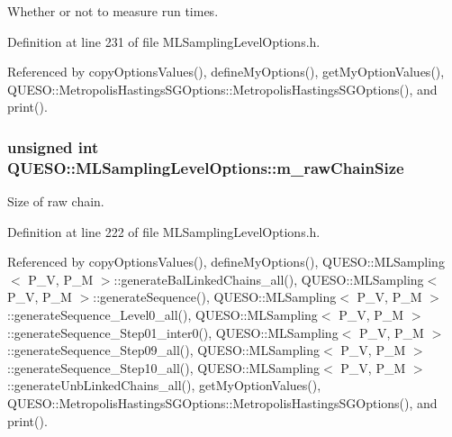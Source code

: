 Whether or not to measure run times. 



Definition at line 231 of file M\-L\-Sampling\-Level\-Options.\-h.



Referenced by copy\-Options\-Values(), define\-My\-Options(), get\-My\-Option\-Values(), Q\-U\-E\-S\-O\-::\-Metropolis\-Hastings\-S\-G\-Options\-::\-Metropolis\-Hastings\-S\-G\-Options(), and print().

\hypertarget{class_q_u_e_s_o_1_1_m_l_sampling_level_options_a8ab85efacd9881ab35b9f01b6e4fc5a3}{
\subsubsection[{m\-\_\-raw\-Chain\-Size}]{\setlength{\rightskip}{0pt plus 5cm}unsigned int Q\-U\-E\-S\-O\-::\-M\-L\-Sampling\-Level\-Options\-::m\-\_\-raw\-Chain\-Size}}\label{class_q_u_e_s_o_1_1_m_l_sampling_level_options_a8ab85efacd9881ab35b9f01b6e4fc5a3}


Size of raw chain. 



Definition at line 222 of file M\-L\-Sampling\-Level\-Options.\-h.



Referenced by copy\-Options\-Values(), define\-My\-Options(), Q\-U\-E\-S\-O\-::\-M\-L\-Sampling$<$ P\-\_\-\-V, P\-\_\-\-M $>$\-::generate\-Bal\-Linked\-Chains\-\_\-all(), Q\-U\-E\-S\-O\-::\-M\-L\-Sampling$<$ P\-\_\-\-V, P\-\_\-\-M $>$\-::generate\-Sequence(), Q\-U\-E\-S\-O\-::\-M\-L\-Sampling$<$ P\-\_\-\-V, P\-\_\-\-M $>$\-::generate\-Sequence\-\_\-\-Level0\-\_\-all(), Q\-U\-E\-S\-O\-::\-M\-L\-Sampling$<$ P\-\_\-\-V, P\-\_\-\-M $>$\-::generate\-Sequence\-\_\-\-Step01\-\_\-inter0(), Q\-U\-E\-S\-O\-::\-M\-L\-Sampling$<$ P\-\_\-\-V, P\-\_\-\-M $>$\-::generate\-Sequence\-\_\-\-Step09\-\_\-all(), Q\-U\-E\-S\-O\-::\-M\-L\-Sampling$<$ P\-\_\-\-V, P\-\_\-\-M $>$\-::generate\-Sequence\-\_\-\-Step10\-\_\-all(), Q\-U\-E\-S\-O\-::\-M\-L\-Sampling$<$ P\-\_\-\-V, P\-\_\-\-M $>$\-::generate\-Unb\-Linked\-Chains\-\_\-all(), get\-My\-Option\-Values(), Q\-U\-E\-S\-O\-::\-Metropolis\-Hastings\-S\-G\-Options\-::\-Metropolis\-Hastings\-S\-G\-Options(), and print().

